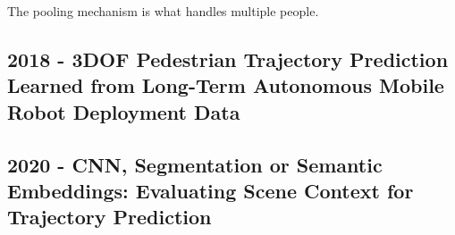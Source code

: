 The pooling mechanism is what handles multiple people.

\subsection*{2018 - 3DOF Pedestrian Trajectory Prediction Learned from Long-Term Autonomous Mobile Robot Deployment Data}

\cite{sun20183dof}

\subsection*{2020 - CNN, Segmentation or Semantic Embeddings: Evaluating Scene Context for Trajectory Prediction}

\cite{syed2020cnn}